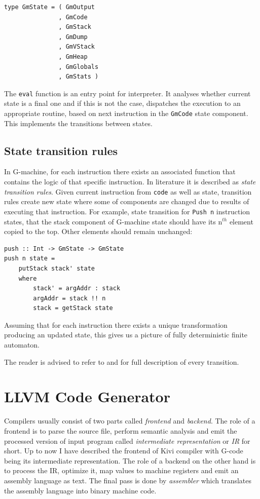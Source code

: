 \documentclass[12pt,a4paper]{report}
\begin{document}
\vspace*{0.2in}
\begin{lstlisting}[style=haskell]
type GmState = ( GmOutput
               , GmCode
               , GmStack
               , GmDump
               , GmVStack
               , GmHeap
               , GmGlobals
               , GmStats )
\end{lstlisting}

The \texttt{eval} function is an entry point for interpreter. It analyses
whether current state is a final one and if this is not the case, dispatches
the execution to an appropriate routine, based on next instruction in the
\texttt{GmCode} state component. This implements the transitions between states.

\subsection{State transition rules}
In G-machine, for each instruction there exists an associated function that
contains the logic of that specific instruction. In literature it is described
as \textit{state transition rules}. Given current instruction from
\texttt{code} as well as state, transition rules create new state where some of
components are changed due to results of executing that instruction. For
example, state transition for \texttt{Push n} instruction states, that the
stack component of G-machine state should have its n$^{th}$ element copied to
the top. Other elements should remain unchanged:

\vspace*{0.2in}
\begin{lstlisting}[style=haskell]
push :: Int -> GmState -> GmState
push n state =
    putStack stack' state
    where
        stack' = argAddr : stack
        argAddr = stack !! n
        stack = getStack state
\end{lstlisting}

Assuming that for each
instruction there exists a unique transformation producing an updated state,
this gives us a picture of fully deterministic finite automaton.

The reader is advised to refer to \cite{Jon87} and \cite{JonLes00} for full
description of every transition.

\section{LLVM Code Generator}
\label{sec:llvm_codegen}
Compilers usually consist of two parts called \textit{frontend} and
\textit{backend}. The role of a frontend is to parse the source file, perform
semantic analysis and emit the processed version of input program called
\textit{intermediate representation} or \textit{IR} for short. Up to now I have
described the frontend of Kivi compiler with G-code being its intermediate
representation. The role of a backend on the other hand is to process the IR,
optimize it, map values to machine registers and emit an assembly language as
text. The final pass is done by \textit{assembler} which translates the
assembly language into binary machine code.
\end{document}
